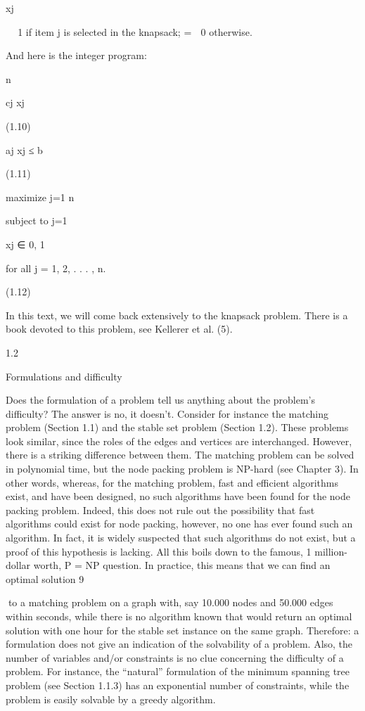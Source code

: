 \documentclass[titlepage]{book}
\begin{document}
xj


 1 if item j is selected in the knapsack;
=
 0 otherwise.

And here is the integer program:

n

cj xj

(1.10)

aj xj ≤ b

(1.11)

maximize
j=1
n

subject to
j=1

xj ∈ {0, 1}

for all j = 1, 2, . . . , n.

(1.12)

In this text, we will come back extensively to the knapsack problem. There is a book devoted to this
problem, see Kellerer et al. (5).

1.2

Formulations and difficulty

Does the formulation of a problem tell us anything about the problem's difficulty? The answer is no,
it doesn't. Consider for instance the matching problem (Section 1.1) and the stable set problem (Section 1.2). These problems look similar, since the roles of the edges and vertices are interchanged. However,
there is a striking difference between them. The matching problem can be solved in polynomial time, but
the node packing problem is NP-hard (see Chapter 3). In other words, whereas, for the matching problem, fast and efficient algorithms exist, and have been designed, no such algorithms have been found for
the node packing problem. Indeed, this does not rule out the possibility that fast algorithms could exist
for node packing, however, no one has ever found such an algorithm. In fact, it is widely suspected that
such algorithms do not exist, but a proof of this hypothesis is lacking. All this boils down to the famous,
1 million-dollar worth, P = NP question. In practice, this means that we can find an optimal solution
9

to a matching problem on a graph with, say 10.000 nodes and 50.000 edges within seconds, while there
is no algorithm known that would return an optimal solution with one hour for the stable set instance
on the same graph. Therefore: a formulation does not give an indication of the solvability of a problem.
Also, the number of variables and/or constraints is no clue concerning the difficulty of a problem. For
instance, the “natural” formulation of the minimum spanning tree problem (see Section 1.1.3) has an
exponential number of constraints, while the problem is easily solvable by a greedy algorithm.
\end{document}
